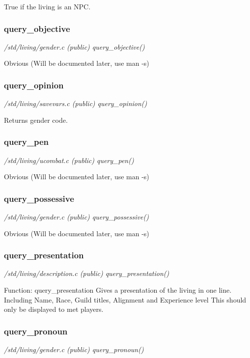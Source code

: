 True if the living is an NPC.


\subsubsection{query\_objective}

{\em /std/living/gender.c (public) query\_objective()}

Obvious (Will be documented later, use man -s)


\subsubsection{query\_opinion}

{\em /std/living/savevars.c (public) query\_opinion()}

Returns gender code.


\subsubsection{query\_pen}

{\em /std/living/ucombat.c (public) query\_pen()}

Obvious (Will be documented later, use man -s)


\subsubsection{query\_possessive}

{\em /std/living/gender.c (public) query\_possessive()}

Obvious (Will be documented later, use man -s)


\subsubsection{query\_presentation}

{\em /std/living/description.c (public) query\_presentation()}

Function:    query\_presentation
Gives a presentation of the living in one line. Including
Name, Race, Guild titles, Alignment and Experience level
This should only be displayed to met players.


\subsubsection{query\_pronoun}

{\em /std/living/gender.c (public) query\_pronoun()}

